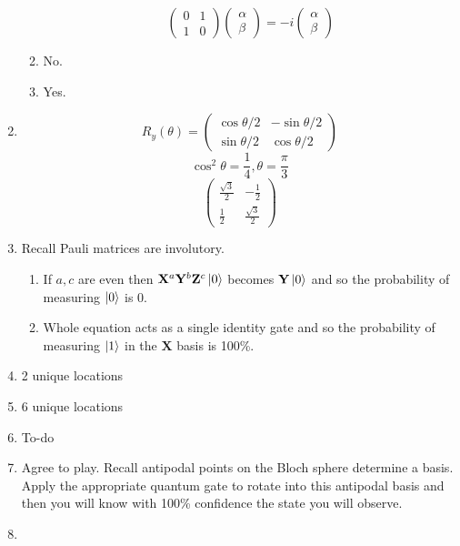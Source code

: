 \documentclass[12pt]{article}
\begin{document}
\begin{enumerate}[font=\bfseries]
\begin{enumerate}
\[\begin{pmatrix}
                0 & 1 \\
                1 & 0
                \end{pmatrix} 
                 \begin{pmatrix} 
                \alpha \\ \beta
                \end{pmatrix} 
                =
                -i
                \begin{pmatrix} 
                \alpha \\ \beta
                \end{pmatrix} 
                \]
        \item No.
        \item Yes.
    \end{enumerate}
    
    \item \[R_y(\theta) = \begin{pmatrix} \cos{\theta/2} & -\sin{\theta/2} \\
        \sin{\theta/2} & \cos{\theta/2}
        \end{pmatrix}\]
        \[\cos^2{\theta} = \frac{1}{4}, \theta = \frac{\pi}{3}\]
        \[\begin{pmatrix} 
        \frac{\sqrt{3}}{2} & -\frac{1}{2} \\
        \frac{1}{2} & \frac{\sqrt{3}}{2}
            \end{pmatrix}
        \]
    \item Recall Pauli matrices are involutory.
        \begin{enumerate}
            \item If $a,c$ are even then $\mathbf{X}^a\mathbf{Y}^b\mathbf{Z}^c\ket{0}$ becomes $\mathbf{Y}\ket{0}$ and so the probability of measuring $\ket{0}$ is 0. 
            \item Whole equation acts as a single identity gate and so the probability of measuring $\ket{1}$ in the $\mathbf{X}$ basis is 100\%.
        \end{enumerate}
    \item 2 unique locations
    \item 6 unique locations
    \item To-do
    \item Agree to play. Recall antipodal points on the Bloch sphere determine a basis. Apply the appropriate quantum gate to rotate into this antipodal basis and then you will know with 100\% confidence the state you will observe.
    \item 
\end{enumerate}
\end{document}
